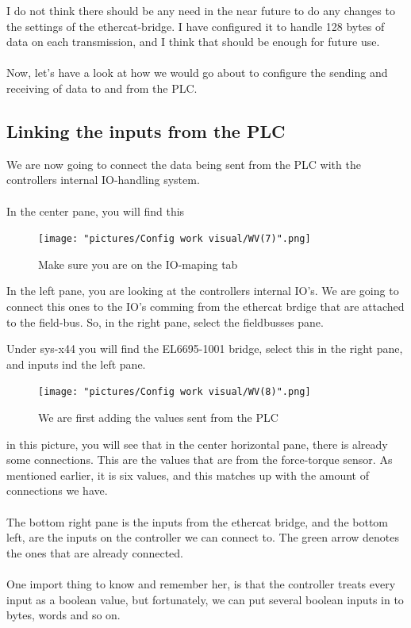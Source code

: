 \documentclass{article}
\begin{document}
I do not think there should be any need in the near future to do any changes to the settings of the ethercat-bridge. I have configured it to handle 128 bytes of data on each transmission, and 
I think that should be enough for future use. 
\\\\
Now, let's have a look at how we would go about to configure the sending and receiving of data to and from the PLC. 

\newpage

\subsection{Linking the inputs from the PLC}
We are now going to connect the data being sent from the PLC with the controllers internal IO-handling system. 
\\\\
In the center pane, you will find this

\begin{figure}[!h]
    \centering
    \texttt{[image: "pictures/Config work visual/WV(7)".png]}
    \caption{Make sure you are on the IO-maping tab }
   
\end{figure}
In the left pane, you are looking at the controllers internal IO's. We are going to connect this ones to the IO's comming from the ethercat brdige that are attached to the field-bus. So, in the right pane, select the fieldbusses pane. 

\newpage
Under sys-x44 you will find the EL6695-1001 bridge, select this in the right pane, and inputs ind the left pane.

\begin{figure}[!h]
    \centering
    \texttt{[image: "pictures/Config work visual/WV(8)".png]}
    \caption{We are first adding the values sent from the PLC}
  
\end{figure}

in this picture, you will see that in the center horizontal pane, there is already some connections. This are the values that are from the force-torque sensor. As mentioned earlier, it is six values, and this matches up with the amount of connections we have. 
\\\\
The bottom right pane is the inputs from the ethercat bridge, and the bottom left, are the inputs on the controller we can connect to. The green arrow denotes the ones that are already connected. 
\\\\
One import thing to know and remember her, is that the controller treats every input as a boolean value, but fortunately, we can put several boolean inputs in to bytes, words and so on.  
\end{document}
